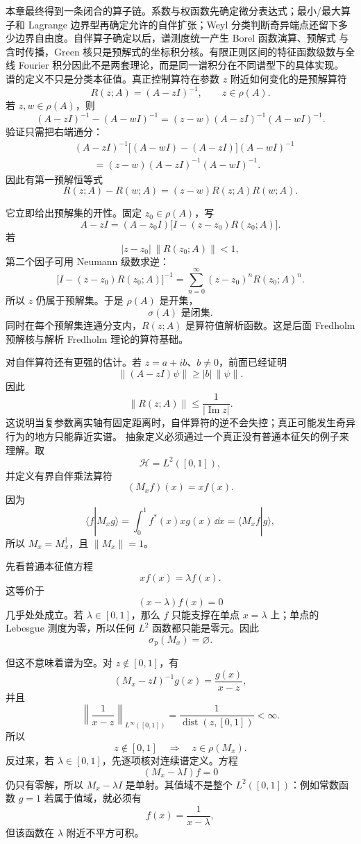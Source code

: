 本章最终得到一条闭合的算子链。系数与权函数先确定微分表达式；最小/最大算子和 Lagrange 边界型再确定允许的自伴扩张；Weyl 分类判断奇异端点还留下多少边界自由度。自伴算子确定以后，谱测度统一产生 Borel 函数演算、预解式 与含时传播，Green 核只是预解式的坐标积分核。有限正则区间的特征函数级数与全线 Fourier 积分因此不是两套理论，而是同一谱积分在不同谱型下的具体实现。
谱的定义不只是分类本征值。真正控制算符在参数 $z$ 附近如何变化的是预解算符
\[
R(z;A)=(A-zI)^{-1},
\qquad z\in\rho(A).
\]
若 $z,w\in\rho(A)$，则
\[
(A-zI)^{-1}-(A-wI)^{-1}
=(z-w)(A-zI)^{-1}(A-wI)^{-1}.
\]
验证只需把右端通分：
\[
\begin{aligned}
&(A-zI)^{-1}\bigl[(A-wI)-(A-zI)\bigr](A-wI)^{-1}\\
&\qquad=(z-w)(A-zI)^{-1}(A-wI)^{-1}.
\end{aligned}
\]
因此有第一预解恒等式
\begin{equation*}\boxed{
R(z;A)-R(w;A)=(z-w)R(z;A)R(w;A)
}.\end{equation*}

它立即给出预解集的开性。固定 $z_0\in\rho(A)$，写
\[
A-zI=(A-z_0I)\bigl[I-(z-z_0)R(z_0;A)\bigr].
\]
若
\[
|z-z_0|\,\|R(z_0;A)\|<1,
\]
第二个因子可用 Neumann 级数求逆：
\[
\bigl[I-(z-z_0)R(z_0;A)\bigr]^{-1}
=\sum_{n=0}^\infty (z-z_0)^nR(z_0;A)^n.
\]
所以 $z$ 仍属于预解集。于是 $\rho(A)$ 是开集，
\[
\boxed{\sigma(A)\text{ 是闭集}.}
\]
同时在每个预解集连通分支内，$R(z;A)$ 是算符值解析函数。这是后面 Fredholm 预解核与解析 Fredholm 理论的算符基础。

对自伴算符还有更强的估计。若 $z=a+ib$、$b\neq0$，前面已经证明
\[
\|(A-zI)\psi\|\ge |b|\,\|\psi\|.
\]
因此
\begin{equation*}\boxed{
\|R(z;A)\|\le \frac1{|\operatorname{Im}z|}
}.\end{equation*}
这说明当复参数离实轴有固定距离时，自伴算符的逆不会失控；真正可能发生奇异行为的地方只能靠近实谱。
抽象定义必须通过一个真正没有普通本征矢的例子来理解。取
\[
\mathcal H=L^2([0,1]),
\]
并定义有界自伴乘法算符
\[
(M_xf)(x)=x f(x).
\]
因为
\[
\langle f|M_xg\rangle
=\int_0^1 f^*(x)xg(x)\,\dd x
=\langle M_xf|g\rangle,
\]
所以 $M_x=M_x^\dagger$，且 $\|M_x\|=1$。

先看普通本征值方程
\[
x f(x)=\lambda f(x).
\]
这等价于
\[
(x-\lambda)f(x)=0
\]
几乎处处成立。若 $\lambda\in[0,1]$，那么 $f$ 只能支撑在单点 $x=\lambda$ 上；单点的 Lebesgue 测度为零，所以任何 $L^2$ 函数都只能是零元。因此
\[
\sigma_{\mathrm p}(M_x)=\varnothing.
\]

但这不意味着谱为空。对 $z\notin[0,1]$，有
\[
(M_x-zI)^{-1}g(x)=\frac{g(x)}{x-z},
\]
并且
\[
\left\|\frac1{x-z}\right\|_{L^\infty([0,1])}
=\frac1{\operatorname{dist}(z,[0,1])}<\infty.
\]
所以
\[
z\notin[0,1]\quad\Longrightarrow\quad z\in\rho(M_x).
\]
反过来，若 $\lambda\in[0,1]$，先逐项核对连续谱定义。方程
\[
(M_x-\lambda I)f=0
\]
仍只有零解，所以 $M_x-\lambda I$ 是单射。其值域不是整个 $L^2([0,1])$：例如常数函数 $g=1$ 若属于值域，就必须有
\[
f(x)=\frac{1}{x-\lambda},
\]
但该函数在 $\lambda$ 附近不平方可积。

